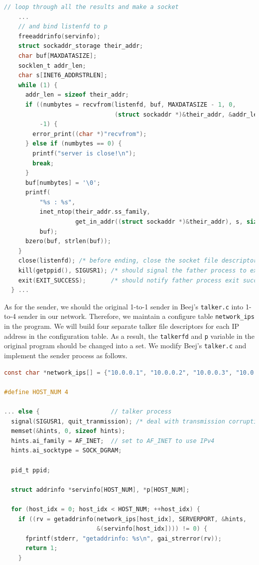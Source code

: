 \begin{exercise}[]
\begin{lstlisting}[language=C]
    // loop through all the results and make a socket
    ...
    // and bind listenfd to p 
    freeaddrinfo(servinfo);
    struct sockaddr_storage their_addr;
    char buf[MAXDATASIZE];
    socklen_t addr_len;
    char s[INET6_ADDRSTRLEN];
    while (1) {
      addr_len = sizeof their_addr;
      if ((numbytes = recvfrom(listenfd, buf, MAXDATASIZE - 1, 0,
                               (struct sockaddr *)&their_addr, &addr_len)) ==
          -1) {
        error_print((char *)"recvfrom");
      } else if (numbytes == 0) {
        printf("server is close!\n");
        break;
      }
      buf[numbytes] = '\0';
      printf(
          "%s : %s",
          inet_ntop(their_addr.ss_family,
                    get_in_addr((struct sockaddr *)&their_addr), s, sizeof s),
          buf);
      bzero(buf, strlen(buf));
    }
    close(listenfd); /* before ending, close the socket file descriptor */
    kill(getppid(), SIGUSR1); /* should signal the father process to exit */
    exit(EXIT_SUCCESS);       /* should notify father process exit success */
  } ... 
\end{lstlisting}

  As for the sender, we should the original 1-to-1 sender in Beej's \texttt{talker.c} into 1-to-4 sender in our network. Therefore, we maintain a configure table \texttt{network\_ips} in the program. We will build four separate talker file descriptors for each IP address in the configuration table. As a result, the \texttt{talkerfd} and \texttt{p} variable in the original program should be changed into a set. We modify Beej's \texttt{talker.c} and implement the sender process as follows.

\begin{lstlisting}[language=C]
const char *network_ips[] = {"10.0.0.1", "10.0.0.2", "10.0.0.3", "10.0.0.4"};

#define HOST_NUM 4

... else {                    // talker process
  signal(SIGUSR1, quit_tranmission); /* deal with transmission corruption */
  memset(&hints, 0, sizeof hints);
  hints.ai_family = AF_INET;  // set to AF_INET to use IPv4
  hints.ai_socktype = SOCK_DGRAM;

  pid_t ppid;

  struct addrinfo *servinfo[HOST_NUM], *p[HOST_NUM];

  for (host_idx = 0; host_idx < HOST_NUM; ++host_idx) {
    if ((rv = getaddrinfo(network_ips[host_idx], SERVERPORT, &hints,
                          &(servinfo[host_idx]))) != 0) {
      fprintf(stderr, "getaddrinfo: %s\n", gai_strerror(rv));
      return 1;
    }


\end{lstlisting}
\end{exercise}
